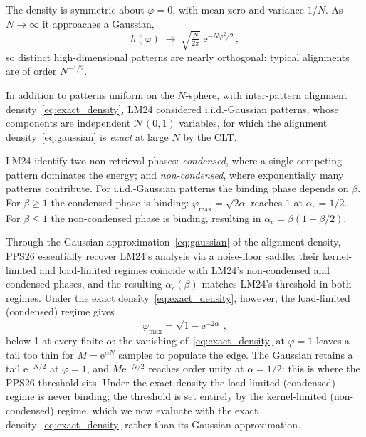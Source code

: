 \documentclass[letterpaper]{article} %
\newcommand{\e}{{\mathrm{e}}}
\newcommand{\Bnet}{\beta}
\begin{document}
The density is symmetric about $\varphi=0$, with mean zero and variance $1/N$. As $N\to\infty$ it approaches a Gaussian,
\begin{equation}
    h(\varphi)\;\longrightarrow \;\sqrt{\tfrac{N}{2\pi}} \; \e^{-N\varphi^2/2}\,,
    \label{eq:gaussian} 
\end{equation}
so distinct high-dimensional patterns are nearly orthogonal: typical alignments are of order $N^{-1/2}$. 

In addition to patterns uniform on the $N$-sphere, with inter-pattern alignment density~\eqref{eq:exact_density}, LM24 considered i.i.d.-Gaussian patterns, whose components are independent $\mathcal N(0,1)$ variables, for which the alignment density~\eqref{eq:gaussian} is \textit{exact} at large $N$ by the CLT. 

LM24 identify two non-retrieval phases: \textit{condensed}, where a single competing pattern dominates the energy; and \textit{non-condensed}, where exponentially many patterns contribute. For i.i.d.-Gaussian patterns the binding phase depends on $\Bnet$. For $\Bnet \geq 1$ the condensed phase is binding: $\varphi_{\max} = \sqrt{2\alpha}$ reaches $1$ at $\alpha_c = 1/2$. For $\Bnet \leq 1$ the non-condensed phase is binding, resulting in $\alpha_c = \Bnet(1 - \Bnet/2)$.

Through the Gaussian approximation~\eqref{eq:gaussian} of the alignment density, PPS26 essentially recover LM24's analysis via a noise-floor saddle: their kernel-limited and load-limited regimes coincide with LM24's non-condensed and condensed phases, and the resulting $\alpha_c(\Bnet)$ matches LM24's threshold in both regimes. Under the exact density~\eqref{eq:exact_density}, however, the load-limited (condensed) regime gives
\begin{equation}
    \varphi_{\max} = \sqrt{1 - \e^{-2\alpha}}\,,
    \label{eq:varphi_max}
\end{equation}
below 1 at every finite $\alpha$: the vanishing of~\eqref{eq:exact_density} at $\varphi = 1$ leaves a tail too thin for $M = \e^{\alpha N}$ samples to populate the edge. The Gaussian retains a tail $\e^{-N/2}$ at $\varphi = 1$, and $M \e^{-N/2}$ reaches order unity at $\alpha = 1/2$: this is where the PPS26 threshold sits. Under the exact density the load-limited (condensed) regime is never binding; the threshold is set entirely by the kernel-limited (non-condensed) regime, which we now evaluate with the exact density~\eqref{eq:exact_density} rather than its Gaussian approximation.
\end{document}
